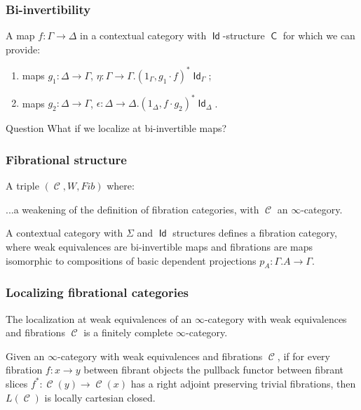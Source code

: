\documentclass{beamer}
\DeclareMathOperator{\Id}{\mathsf{Id}}
\DeclareMathOperator{\sfC}{\mathsf{C}}
\DeclareMathOperator{\cC}{\mathcal{C}}
\begin{document}
\begin{frame}
  \frametitle{Bi-invertibility}

  \begin{defn}
    A map $f\colon\Gamma\rightarrow\Delta$ in a contextual category with
    $\Id$-structure $\sfC$ for which we can provide:
    \begin{enumerate}
      \item maps $g_1\colon\Delta\rightarrow\Gamma$,
        $\eta\colon\Gamma\rightarrow\Gamma.(1_\Gamma,g_1\cdot f)^*\Id_\Gamma$;
      \item maps $g_2\colon\Delta\rightarrow\Gamma$,
        $\epsilon\colon\Delta\rightarrow\Delta.(1_\Delta,f\cdot g_2)^*\Id_\Delta$.
    \end{enumerate}
  \end{defn}
  \pause

  \begin{block}{Question}
    What if we localize at bi-invertible maps?
  \end{block}
\end{frame}

\begin{frame}
  \frametitle{Fibrational structure}
  
  \begin{defn}
    A triple $(\cC,W,Fib)$ where:

    ...a weakening of the definition of fibration categories, with $\cC$ an
    $\infty$-category.
  \end{defn}
  \pause

  \begin{thm}
    A contextual category with $\Sigma$ and $\Id$ structures defines a
    fibration category, where weak
    equivalences are bi-invertible maps and
    fibrations are maps isomorphic to  compositions of basic dependent
    projections $p_A\colon\Gamma.A\rightarrow\Gamma$.
  \end{thm}
\end{frame}

\begin{frame}
  \frametitle{Localizing fibrational categories}

  \begin{prop}[Cisinski]
    The localization at weak equivalences of an $\infty$-category with weak
    equivalences and fibrations $\cC$ is a finitely complete $\infty$-category.
  \end{prop}

  \begin{prop}[Cisinski]
    Given an $\infty$-category with weak equivalences and fibrations $\cC$, if
    for every fibration $f\colon x\rightarrow y$ between fibrant objects the
    pullback functor between fibrant slices $f^*\colon\cC(y)\rightarrow\cC(x)$
    has a right adjoint preserving trivial fibrations, then $L(\cC)$ is locally
    cartesian closed.
  \end{prop}
\end{frame}
\end{document}

